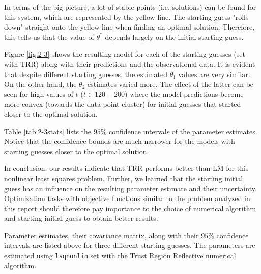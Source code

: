In terms of the big picture, a lot of stable points (i.e. solutions) can be found for this system, which are represented by the yellow line. The starting guess "rolls down" straight onto the yellow line when finding an optimal solution. Therefore, this tells us that the value of $\theta^*$ depends largely on the initial starting guess. 

Figure \ref{fig:2-3} shows the resulting model for each of the starting guesses (set with TRR) along with their predictions and the observational data. It is evident that despite different starting guesses, the estimated $\theta_1$ values are very similar. On the other hand, the $\theta_2$ estimates varied more. The effect of the latter can be seen for high values of $t$ ($t\in 120-200$) where the model predictions become more convex (towards the data point cluster) for initial guesses that started closer to the optimal solution. 

Table \ref{tab:2-3stats} lists the $95\%$ confidence intervals of the parameter estimates. Notice that the confidence bounds are much narrower for the models with starting guesses closer to the optimal solution. 

In conclusion, our results indicate that TRR performs better than LM for this nonlinear least squares problem. Further, we learned that the starting initial guess has an influence on the resulting parameter estimate and their uncertainty. Optimization tasks with objective functions similar to the problem analyzed in this report should therefore pay importance to the choice of numerical algorithm and starting initial guess to obtain better results.  

\vspace*{\fill} 
\begin{table}[htbp]
\centering
\footnotesize

\caption{Parameter estimates, their covariance matrix, along with their $95\%$ confidence intervals are listed above for three different starting guesses. The parameters are estimated using \texttt{lsqnonlin} set with the Trust Region Reflective numerical algorithm.}
\label{tab:2-3stats}
\end{table}
\vspace*{\fill} 
